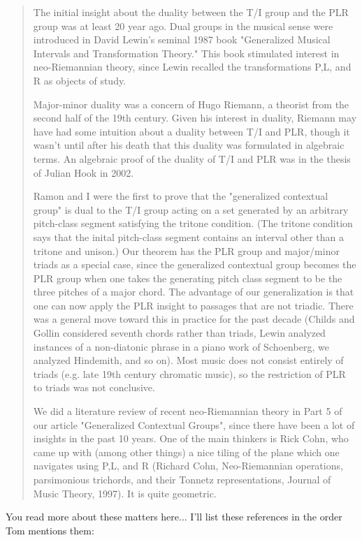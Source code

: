 \begin{quote}
  The initial insight about the duality between the T/I group and 
  the PLR group was at least 20 year ago.  Dual groups in the musical
  sense were introduced in David Lewin's seminal 1987 book "Generalized
  Musical Intervals and Transformation Theory."  This book stimulated
  interest in neo-Riemannian theory, since Lewin recalled the
  transformations P,L, and R as objects of study.

  Major-minor duality was a concern of Hugo Riemann, a theorist from
  the second half of the 19th century.  Given his interest in duality,
  Riemann may have had some intuition about a duality between T/I and
  PLR, though it wasn't until after his death that this duality was
  formulated in algebraic terms.  An algebraic proof of the duality of
  T/I and PLR was in the thesis of Julian Hook in 2002.
   
  Ramon and I were the first to prove that the "generalized contextual 
  group" is dual to the T/I group acting on a set generated by an 
  arbitrary pitch-class segment satisfying the tritone condition.  
  (The tritone condition says that the inital pitch-class segment 
  contains an interval other than a tritone and unison.)  Our 
  theorem has the PLR group and major/minor triads as a special case,
  since the generalized contextual group becomes the PLR group when one
  takes the generating pitch class segment to be the three pitches of a
  major chord.  The advantage of our generalization is that one can now
  apply the PLR insight to passages that are not triadic.  There was a
  general move toward this in practice for the past decade (Childs and
  Gollin considered seventh chords rather than triads, Lewin analyzed
  instances of a non-diatonic phrase in a piano work of Schoenberg, we
  analyzed Hindemith, and so on).  Most music does not consist entirely
  of triads (e.g. late 19th century chromatic music), so the restriction
  of PLR to triads was not conclusive.
   
  We did a literature review of recent neo-Riemannian theory in Part 
  5 of our article "Generalized Contextual Groups", since there have 
  been a lot of insights in the past 10 years.  One of the main
  thinkers is Rick Cohn, who came up with (among other things) a 
  nice tiling of the plane which one navigates using P,L, and R 
  (Richard Cohn, Neo-Riemannian operations, parsimonious trichords, 
  and their Tonnetz representations, Journal of Music Theory, 1997).  
  It is quite geometric. 

\end{quote}
You read more about these matters here... I'll list these references 
in the order Tom mentions them:

